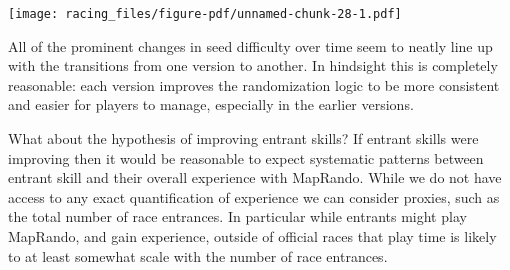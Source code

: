\documentclass[
  letterpaper,
  DIV=11,
  numbers=noendperiod]{scrartcl}
\newenvironment{Shaded}{\begin{snugshade}}{\end{snugshade}}
\newcommand{\AttributeTok}[1]{\textcolor[rgb]{0.40,0.45,0.13}{#1}}
\newcommand{\ControlFlowTok}[1]{\textcolor[rgb]{0.00,0.23,0.31}{#1}}
\newcommand{\DecValTok}[1]{\textcolor[rgb]{0.68,0.00,0.00}{#1}}
\newcommand{\FunctionTok}[1]{\textcolor[rgb]{0.28,0.35,0.67}{#1}}
\newcommand{\NormalTok}[1]{\textcolor[rgb]{0.00,0.23,0.31}{#1}}
\newcommand{\OtherTok}[1]{\textcolor[rgb]{0.00,0.23,0.31}{#1}}
\newcommand{\SpecialCharTok}[1]{\textcolor[rgb]{0.37,0.37,0.37}{#1}}
\newcommand{\StringTok}[1]{\textcolor[rgb]{0.13,0.47,0.30}{#1}}
\begin{document}
\texttt{[image: racing\_files/figure-pdf/unnamed-chunk-28-1.pdf]}

All of the prominent changes in seed difficulty over time seem to neatly
line up with the transitions from one version to another. In hindsight
this is completely reasonable: each version improves the randomization
logic to be more consistent and easier for players to manage, especially
in the earlier versions.

What about the hypothesis of improving entrant skills? If entrant skills
were improving then it would be reasonable to expect systematic patterns
between entrant skill and their overall experience with MapRando. While
we do not have access to any exact quantification of experience we can
consider proxies, such as the total number of race entrances. In
particular while entrants might play MapRando, and gain experience,
outside of official races that play time is likely to at least somewhat
scale with the number of race entrances.

\begin{Shaded}
\end{Shaded}
\end{document}
